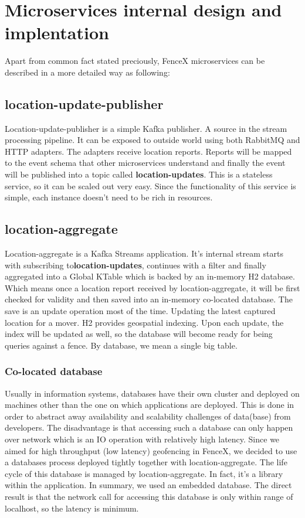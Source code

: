 \documentclass[a4]{report}
\begin{document}
    \section{Microservices internal design and implentation}
    Apart from common fact stated preciously, FenceX microservices can be described in a more detailed way as following:

    \subsection{location-update-publisher}
    Location-update-publisher is a simple Kafka publisher.
    A source in the stream processing pipeline.
    It can be exposed to outside world using both RabbitMQ and HTTP adapters.
    The adapters receive location reports.
    Reports will be mapped to the event schema that other microservices
    understand and finally the event will be published into a topic called \textbf{location-updates}.
    This is a stateless service, so it can be scaled out very easy.
    Since the functionality of this service is simple, each instance doesn't need to be rich in resources.

    \subsection{location-aggregate}
    Location-aggregate is a Kafka Streams application.
    It's internal stream starts with subscribing to\textbf{location-updates}, continues with a filter and finally
    aggregated into a Global KTable which is backed by an in-memory H2 database.
    Which means once a location report received by location-aggregate, it will be first checked for validity and then
    saved into an in-memory co-located database.
    The save is an update operation most of the time.
    Updating the latest captured location for a mover.
    H2 provides geospatial indexing.
    Upon each update, the index will be updated as well, so the database will become ready for being queries against a
    fence.
    By database, we mean a single big table.

    \subsubsection{Co-located database}
    Usually in information systems, databases have their own cluster and deployed on machines other than the one on
    which applications are deployed.
    This is done in order to abstract away availability and scalability challenges of data(base) from developers.
    The disadvantage is that accessing such a database can only happen over network which is an IO operation with
    relatively high latency.
    Since we aimed for high throughput (low latency) geofencing in FenceX, we decided to use a databases process
    deployed tightly together with location-aggregate.
    The life cycle of this database is managed by location-aggregate.
    In fact, it's a library within the application.
    In summary, we used an embedded database.
    The direct result is that the network call for accessing this database is only within range of localhost, so the
    latency is minimum.
\end{document}
